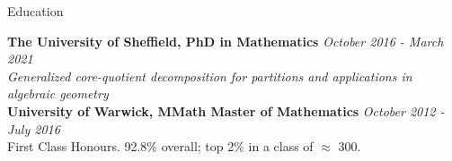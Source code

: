 \documentclass{resume} %
\begin{document}

\begin{rSection}{Education}

{\bf The University of Sheffield, PhD in Mathematics} \hfill {\em October 2016 - March 2021} \\ 
\emph{Generalized core-quotient decomposition for partitions and applications in algebraic geometry} \\
{\bf University of Warwick, MMath Master of Mathematics} \hfill {\em October 2012 - July 2016} \\
First Class Honours. 92.8\% overall; top 2\% in a class of $\approx$ 300.

\end{rSection}

\end{document}
